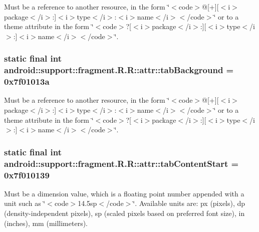 Must be a reference to another resource, in the form \char`\"{}$<$code$>$@\mbox{[}+\mbox{]}\mbox{[}$<$i$>$package$<$/i$>$:\mbox{]}$<$i$>$type$<$/i$>$:$<$i$>$name$<$/i$>$$<$/code$>$\char`\"{} or to a theme attribute in the form \char`\"{}$<$code$>$?\mbox{[}$<$i$>$package$<$/i$>$:\mbox{]}\mbox{[}$<$i$>$type$<$/i$>$:\mbox{]}$<$i$>$name$<$/i$>$$<$/code$>$\char`\"{}. \hypertarget{classandroid_1_1support_1_1fragment_1_1_r_1_1attr_ce643a849fb6c2418e34eb81a832d444}{
\subsubsection[{tabBackground}]{\setlength{\rightskip}{0pt plus 5cm}static final int android::support::fragment.R.R::attr::tabBackground = 0x7f01013a}}
\label{classandroid_1_1support_1_1fragment_1_1_r_1_1attr_ce643a849fb6c2418e34eb81a832d444}


Must be a reference to another resource, in the form \char`\"{}$<$code$>$@\mbox{[}+\mbox{]}\mbox{[}$<$i$>$package$<$/i$>$:\mbox{]}$<$i$>$type$<$/i$>$:$<$i$>$name$<$/i$>$$<$/code$>$\char`\"{} or to a theme attribute in the form \char`\"{}$<$code$>$?\mbox{[}$<$i$>$package$<$/i$>$:\mbox{]}\mbox{[}$<$i$>$type$<$/i$>$:\mbox{]}$<$i$>$name$<$/i$>$$<$/code$>$\char`\"{}. \hypertarget{classandroid_1_1support_1_1fragment_1_1_r_1_1attr_3ba102338a517e26fe500a13b28bf228}{
\subsubsection[{tabContentStart}]{\setlength{\rightskip}{0pt plus 5cm}static final int android::support::fragment.R.R::attr::tabContentStart = 0x7f010139}}
\label{classandroid_1_1support_1_1fragment_1_1_r_1_1attr_3ba102338a517e26fe500a13b28bf228}


Must be a dimension value, which is a floating point number appended with a unit such as \char`\"{}$<$code$>$14.5sp$<$/code$>$\char`\"{}. Available units are: px (pixels), dp (density-independent pixels), sp (scaled pixels based on preferred font size), in (inches), mm (millimeters). 

